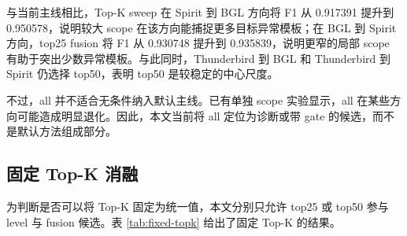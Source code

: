 \documentclass[UTF8,a4paper,zihao=-4]{ctexart}
\begin{document}
\begin{table}[htbp]
\centering
\caption{不同 Top-K 范围消融结果}
\label{tab:topk-sweep}
\end{table}

与当前主线相比，Top-K sweep 在 Spirit 到 BGL 方向将 F1 从 0.917391 提升到 0.950578，说明较大 scope 在该方向能捕捉更多目标异常模板；在 BGL 到 Spirit 方向，top25 fusion 将 F1 从 0.930748 提升到 0.935839，说明更窄的局部 scope 有助于突出少数异常模板。与此同时，Thunderbird 到 BGL 和 Thunderbird 到 Spirit 仍选择 top50，表明 top50 是较稳定的中心尺度。

不过，all 并不适合无条件纳入默认主线。已有单独 scope 实验显示，all 在某些方向可能造成明显退化。因此，本文当前将 all 定位为诊断或带 gate 的候选，而不是默认方法组成部分。

\subsection{固定 Top-K 消融}

为判断是否可以将 Top-K 固定为统一值，本文分别只允许 top25 或 top50 参与 level 与 fusion 候选。表 \ref{tab:fixed-topk} 给出了固定 Top-K 的结果。
\end{document}
